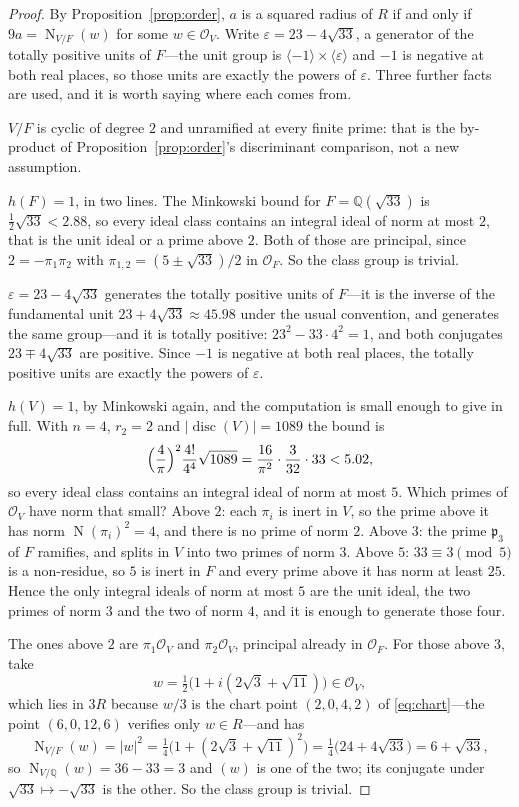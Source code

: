 \documentclass[11pt,reqno]{amsart}
\theoremstyle{plain}
\theoremstyle{definition}
\newcommand{\Q}{\mathbb{Q}}
\newcommand{\Lat}{R}
\newcommand{\Ok}{\mathcal{O}}
\DeclareMathOperator{\Nm}{N}
\begin{document}
\begin{proof}
By Proposition~\ref{prop:order}, $a$ is a squared radius of $\Lat$ if and only if
$9a = \Nm_{V/F}(w)$ for some $w \in \Ok_V$. Write $\varepsilon = 23 - 4\sqrt{33}$, a generator of the totally positive units
of $F$---the unit group is $\langle -1\rangle \times \langle\varepsilon\rangle$ and
$-1$ is negative at both real places, so those units are exactly the powers of
$\varepsilon$. Three further facts are used, and it is worth saying where each
comes from.

$V/F$ is cyclic of degree $2$ and unramified at every finite prime: that is the
by-product of Proposition~\ref{prop:order}'s discriminant comparison, not a new
assumption.

$h(F) = 1$, in two lines. The Minkowski bound for $F = \Q(\sqrt{33})$ is
$\tfrac12\sqrt{33} < 2.88$, so every ideal class contains an integral ideal of
norm at most $2$, that is the unit ideal or a prime above $2$. Both of those are
principal, since $2 = -\pi_1\pi_2$ with $\pi_{1,2} = (5 \pm \sqrt{33})/2$ in
$\Ok_F$. So the class group is trivial.

$\varepsilon = 23 - 4\sqrt{33}$ generates the totally positive units of $F$---it
is the inverse of the fundamental unit $23 + 4\sqrt{33} \approx 45.98$ under the
usual convention, and generates the same group---and it is totally
positive: $23^2 - 33\cdot4^2 = 1$, and both conjugates $23 \mp 4\sqrt{33}$ are
positive. Since $-1$ is negative at both real places, the totally positive units
are exactly the powers of $\varepsilon$.

$h(V) = 1$, by Minkowski again, and the computation is small enough to give in
full. With $n = 4$, $r_2 = 2$ and $\lvert\operatorname{disc}(V)\rvert = 1089$ the
bound is
\[
  \Bigl(\frac4\pi\Bigr)^{2}\frac{4!}{4^4}\sqrt{1089}
  = \frac{16}{\pi^2}\cdot\frac{3}{32}\cdot 33 < 5.02 ,
\]
so every ideal class contains an integral ideal of norm at most $5$. Which primes
of $\Ok_V$ have norm that small? Above $2$: each $\pi_i$ is inert in $V$, so the
prime above it has norm $\Nm(\pi_i)^2 = 4$, and there is no prime of norm $2$.
Above $3$: the prime $\mathfrak p_3$ of $F$ ramifies, and splits in $V$ into two
primes of norm $3$. Above $5$: $33 \equiv 3 \pmod 5$ is a non-residue, so $5$ is
inert in $F$ and every prime above it has norm at least $25$. Hence the only
integral ideals of norm at most $5$ are the unit ideal, the two primes of norm $3$
and the two of norm $4$, and it is enough to generate those four.

The ones above $2$ are $\pi_1\Ok_V$ and $\pi_2\Ok_V$, principal already in
$\Ok_F$. For those above $3$, take
\[
  w = \tfrac12\bigl(1 + i(2\sqrt3 + \sqrt{11})\bigr) \in \Ok_V,
\]
which lies in $3\Lat$ because $w/3$ is the chart point $(2,0,4,2)$ of
\eqref{eq:chart}---the point $(6,0,12,6)$ verifies only $w \in \Lat$---and has
\[
  \Nm_{V/F}(w) = \lvert w \rvert^2
  = \tfrac14\bigl(1 + (2\sqrt3+\sqrt{11})^2\bigr)
  = \tfrac14\bigl(24 + 4\sqrt{33}\bigr) = 6 + \sqrt{33},
\]
so $\Nm_{V/\Q}(w) = 36 - 33 = 3$ and $(w)$ is one of the two; its conjugate under
$\sqrt{33} \mapsto -\sqrt{33}$ is the other. So the class group is trivial.


\end{proof}
\end{document}
